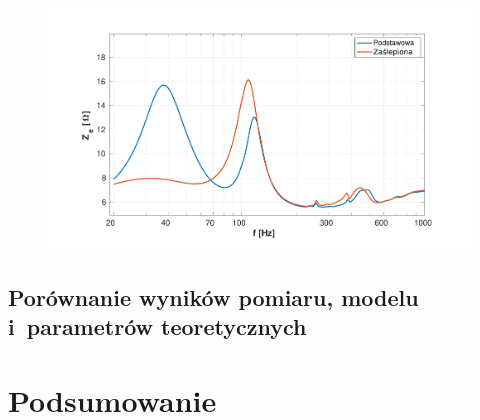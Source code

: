 \documentclass[12pt]{oska}
\begin{document}
		
		\begin{figure}[!ht]
			\centering
			\includegraphics[width=\textwidth,trim={2cm .5cm 2cm 1cm},clip]{obudowa_otwory.pdf}
			\caption{}
			\label{r:obudowa_otwory}
		\end{figure}
		
	
	\subsection{Porównanie wyników pomiaru, modelu i~parametrów teoretycznych}

\section{Podsumowanie}

\printbibliography
\end{document}
